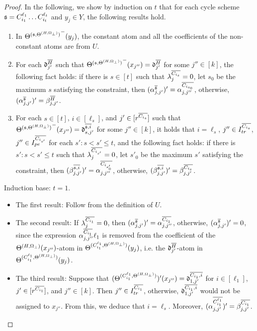 \begin{appendix}
\begin{proof}
In the following, we show by induction on $t$ that for each cycle scheme ${\mathfrak{s} }=C^{\ell_1}_{i_1} \dots C^{\ell_t}_{i_t}$ and $y_j \in Y$, the following results hold.
\begin{enumerate}
\item In ${\Theta^{({\mathfrak{s} },\Theta^{(H,\Omega_\bot)})}}^-(y_j)$, the constant atom and all the coefficients of the non-constant atoms are from $U$.
%
\item For each $\mathfrak{d}^{\overline{H}}_{j'}$ such that ${\Theta^{({\mathfrak{s} },\Theta^{(H,\Omega_\bot)})}}^-(x_{j''})=\mathfrak{d}^{\overline{H}}_{j'}$ for some $j''  \in [k]$, the following fact holds: if there is $s \in [t]$ such that $\lambda^{\overline{C_{i_s}}}_j =0$, let $s_0$ be the maximum $s$ satisfying the constraint, then $(\alpha^{\overline{{\mathfrak{s} }}}_{j,j'})'=\alpha^{\overline{C_{i_{s_0}}}}_{j, j''}$, otherwise, $(\alpha^{\overline{{\mathfrak{s} }}}_{j,j'})'= \beta^{\overline{H}}_{j,j'}$.
%
\item For each $s \in [t]$, $i \in [\ell_s]$, and $j' \in [r^{\overline{C_{i_s}}}]$ such that ${\Theta^{({\mathfrak{s} },\Theta^{(H,\Omega_\bot)})}}^-(x_{j''})=\mathfrak{d}^{\overline{{\mathfrak{s} }, i}}_{s, j'}$ for some $j''  \in [k]$, it holds that $i = \ell_s$, $j'' \in I^{\overline{C_{i_s}}}_{tr}$, $j'' \in I^{\overline{C_{i_{s'}}}}_{pe}$ for each $s': s < s' \le t$, and the following fact holds: if there is $s': s < s' \le t$ such that $\lambda^{\overline{C_{i_{s'}}}}_j =0$, let $s'_0$ be the maximum $s'$ satisfying the constraint, then $(\beta^{\overline{{\mathfrak{s} }, i}}_{j,j'})'=\alpha^{\overline{C_{i_{s'_0}}}}_{j, j''}$, otherwise, $(\beta^{\overline{{\mathfrak{s} }, i}}_{j,j'})'= \beta^{\overline{C_{i_s}}}_{j,j'}$. 
\end{enumerate}

Induction base: $t=1$. 
\begin{itemize}
\item The first result: Follow from the definition of $U$. 

\item The second result: If $\lambda^{\overline{C_{i_1}}}_j = 0$, then $(\alpha^{\overline{{\mathfrak{s} }}}_{j,j'})'=\alpha^{\overline{C_{i_{1}}}}_{j, j''}$,  otherwise, $(\alpha^{\overline{{\mathfrak{s} }}}_{j,j'})'=0$, since the expression $\alpha^{\overline{C_{i_1}}}_{j,j''} \ell_1$ is removed from the coefficient of the $\Theta^{(H,\Omega_\bot)}(x_{j''})$-atom in $\Theta^{(C^{\ell_1}_{i_1},\Theta^{(H,\Omega_\bot)})}(y_j)$, i.e. the $\mathfrak{d}^{\overline{H}}_{j'}$-atom in $\Theta^{(C^{\ell_1}_{i_1},\Theta^{(H,\Omega_\bot)})}(y_j)$. 

\item The third result: Suppose that $(\Theta^{(C^{\ell_1}_{i_1},\Theta^{(H,\Omega_\bot)})})'(x_{j''})=\mathfrak{d}^{\overline{C_{i_1}, i}}_{1, j'}$ for $i \in [\ell_1]$, $j' \in [r^{\overline{C_{i_1}}}]$, and $j'' \in [k]$. Then $j'' \in I^{\overline{C_{i_1}}}_{tr}$, otherwise, $\mathfrak{d}^{\overline{C_{i_1}, i}}_{1, j'}$ would not be assigned to $x_{j''}$. From this, we deduce that $i = \ell_s$. Moreover, $(\alpha^{\overline{C^{\ell_1}_{i_1}}}_{j,j'})'= \beta^{\overline{C_{i_1}}}_{j,j'}$. 
\end{itemize}


\end{proof}
\end{appendix}
